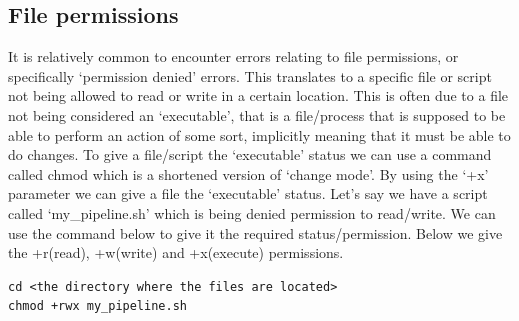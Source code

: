 \subsection{File permissions}
It is relatively common to encounter errors relating to file permissions, or specifically `permission denied' errors. This translates to a specific file or script not being allowed to read or write in a certain location. This is often due to a file not being considered an `executable', that is a file/process that is supposed to be able to perform an action of some sort, implicitly meaning that it must be able to do changes. To give a file/script the `executable' status we can use a command called chmod which is a shortened version of `change mode'. By using the `+x' parameter we can give a file the `executable' status. Let's say we have a script called `my\_pipeline.sh' which is being denied permission to read/write. We can use the command below to give it the required status/permission. Below we give the +r(read), +w(write) and +x(execute) permissions.
\begin{lstlisting}
cd <the directory where the files are located>
chmod +rwx my_pipeline.sh
\end{lstlisting}
